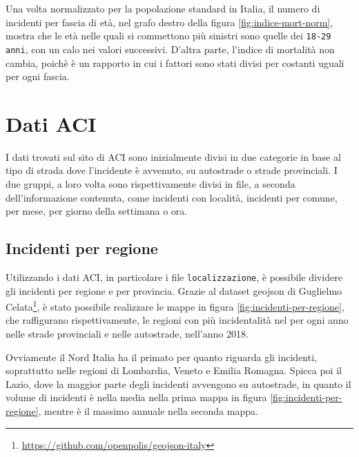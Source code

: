 \documentclass[a4paper]{report}
\newcommand{\columnstyle}[1]{\texttt{#1}}
\begin{document}
Una volta normalizzato per la popolazione standard in Italia, il numero di incidenti per 
fascia di età, nel grafo destro della figura \ref{fig:indice-mort-norm}, mostra che le 
età nelle quali si commettono più sinistri sono quelle dei \columnstyle{18-29 anni}, 
con un calo nei valori successivi.
D'altra parte, l'indice di mortalità non cambia, poichè è un rapporto in cui i fattori 
sono stati divisi per costanti uguali per ogni fascia.

\section{Dati ACI}

I dati trovati sul sito di ACI sono inizialmente divisi in due categorie in 
base al tipo di strada dove l'incidente è avvenuto, 
su autostrade o strade provinciali.
I due gruppi, a loro volta sono rispettivamente divisi in file, a seconda 
dell'informazione contenuta, come incidenti con località, incidenti per 
comune, per mese, per giorno della settimana o ora.

\subsection{Incidenti per regione}

Utilizzando i dati ACI, in particolare i file \columnstyle{localizzazione}, è 
possibile dividere gli incidenti per regione e per provincia.
Grazie al dataset geojson di Guglielmo 
Celata\footnote{\url{https://github.com/openpolis/geojson-italy}}, 
è stato possibile realizzare le mappe in figura \ref{fig:incidenti-per-regione}, 
che raffigurano rispettivamente, le regioni con più incidentalità nel per ogni 
anno nelle strade provinciali e nelle autostrade, nell'anno 2018.

Ovviamente il Nord Italia ha il primato per quanto riguarda gli incidenti, 
soprattutto nelle regioni di Lombardia, Veneto e Emilia Romagna. 
Spicca poi il Lazio, dove la maggior parte degli incidenti avvengono su autostrade, 
in quanto il volume di incidenti è nella media nella prima mappa in figura 
\ref{fig:incidenti-per-regione}, mentre è il massimo annuale nella seconda mappa.
\end{document}
